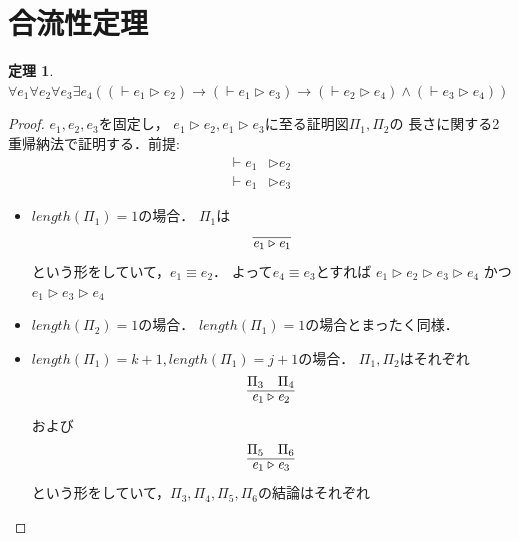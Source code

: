 \documentclass{ltjsbook}%
\newtheorem{theorem}{定理}[section]%
\begin{document}
\section{合流性定理}%
\label{sect:cr}%
\begin{theorem}%
  $\forall\mathit{e}_1\forall\mathit{e}_2\forall\mathit{e}_3\exists\mathit{e}_4%
  ((\vdash\mathit{e}_1\triangleright\mathit{e}_2)\rightarrow%
  (\vdash\mathit{e}_1\triangleright\mathit{e}_3)\rightarrow%
  (\vdash\mathit{e}_2\triangleright\mathit{e}_4)\land%
  (\vdash\mathit{e}_3\triangleright\mathit{e}_4))$%
\end{theorem}%
\iffalse%
\begin{proof}%
  $\mathit{e}_1,\mathit{e}_2,\mathit{e}_3$を固定し，%
  $\mathit{e}_1\triangleright\mathit{e}_2,%
  \mathit{e}_1\triangleright\mathit{e}_3$に至る証明図$\Pi_1,\Pi_2$の%
  長さに関する2重帰納法で証明する．前提:%
  \begin{align}%
    \vdash\mathit{e}_1&\triangleright\mathit{e}_2\\%
    \vdash\mathit{e}_1&\triangleright\mathit{e}_3%
  \end{align}%
  \begin{itemize}%
  \item $length(\Pi_1)=1$の場合．%
    $\Pi_1$は%
    \begin{equation}%
      \infer{%
        \mathit{e}_1\triangleright\mathit{e}_1%
      }{%
      }%
    \end{equation}%
    という形をしていて，$\mathit{e}_1\equiv\mathit{e}_2$．%
    よって$\mathit{e}_4\equiv\mathit{e}_3$とすれば%
    $\mathit{e}_1\triangleright\mathit{e}_2%
    \triangleright\mathit{e}_3%
    \triangleright\mathit{e}_4$%
    かつ%
    $\mathit{e}_1\triangleright\mathit{e}_3%
    \triangleright\mathit{e}_4$%
  \item $length(\Pi_2)=1$の場合．%
    $length(\Pi_1)=1$の場合とまったく同様．%
  \item $length(\Pi_1)=k + 1,length(\Pi_1)=j + 1$の場合．%
    $\Pi_1,\Pi_2$はそれぞれ%
    \begin{equation}%
      \infer{%
        \mathit{e}_1\triangleright\mathit{e}_2%
      }{%
        \Pi_3%
      &%
        \Pi_4%
      }%
    \end{equation}%
    および%
    \begin{equation}%
      \infer{%
        \mathit{e}_1\triangleright\mathit{e}_3%
      }{%
        \Pi_5%
      &%
        \Pi_6%
      }%
    \end{equation}%
    という形をしていて，$\Pi_3,\Pi_4,\Pi_5,\Pi_6$の結論はそれぞれ%

\end{itemize}
\end{proof}
\end{document}
